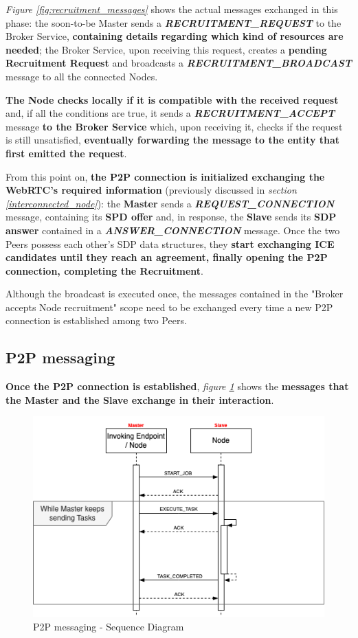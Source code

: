 \textit{Figure \ref{fig:recruitment_messages}} shows the actual messages exchanged in this phase: the soon-to-be Master sends a \textbf{\textit{RECRUITMENT\_REQUEST}} to the Broker Service, \textbf{containing details regarding which kind of resources are needed}; the Broker Service, upon receiving this request, creates a \textbf{pending Recruitment Request} and broadcasts a \textbf{\textit{RECRUITMENT\_BROADCAST}} message to all the connected Nodes.

\textbf{The Node checks locally if it is compatible with the received request} and, if all the conditions are true, it sends a \textit{\textbf{RECRUITMENT\_ACCEPT}} message \textbf{to the Broker Service} which, upon receiving it, checks if the request is still unsatisfied, \textbf{eventually forwarding the message to the entity that first emitted the request}.

From this point on, \textbf{the P2P connection is initialized exchanging the WebRTC's required information} (previously discussed in \textit{section \ref{interconnected_node}}): the \textbf{Master} sends a \textbf{\textit{REQUEST\_CONNECTION}} message, containing its \textbf{SPD offer} and, in response, the \textbf{Slave} sends its \textbf{SDP answer} contained in a \textbf{\textit{ANSWER\_CONNECTION}} message. Once the two Peers possess each other's SDP data structures, they \textbf{start exchanging ICE candidates until they reach an agreement, finally opening the P2P connection, completing the Recruitment}.

Although the broadcast is executed once, the messages contained in the "Broker accepts Node recruitment" scope need to be exchanged every time a new P2P connection is established among two Peers.

\subsection{P2P messaging}
\textbf{Once the P2P connection is established}, \textit{figure \ref{fig:p2p_messages}} shows the \textbf{messages that the Master and the Slave exchange in their interaction}.

\begin{figure}[!ht]
    \centering
    \includegraphics[scale=0.61]{document/chapters/chapter_6/images/p2p_messages.png}
    \caption{P2P messaging - Sequence Diagram}
    \label{fig:p2p_messages}
\end{figure}

